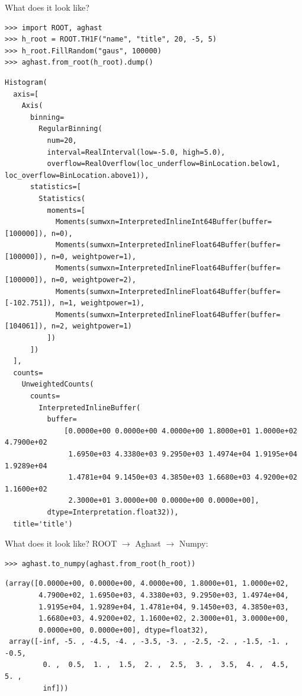 \documentclass[aspectratio=169]{beamer}
\begin{document}
\begin{frame}[fragile]{What does it look like?}
\small
\begin{verbatim}
>>> import ROOT, aghast
>>> h_root = ROOT.TH1F("name", "title", 20, -5, 5)
>>> h_root.FillRandom("gaus", 100000)
>>> aghast.from_root(h_root).dump()
\end{verbatim}


\tiny
\begin{verbatim}
Histogram(
  axis=[
    Axis(
      binning=
        RegularBinning(
          num=20,
          interval=RealInterval(low=-5.0, high=5.0),
          overflow=RealOverflow(loc_underflow=BinLocation.below1, loc_overflow=BinLocation.above1)),
      statistics=[
        Statistics(
          moments=[
            Moments(sumwxn=InterpretedInlineInt64Buffer(buffer=[100000]), n=0),
            Moments(sumwxn=InterpretedInlineFloat64Buffer(buffer=[100000]), n=0, weightpower=1),
            Moments(sumwxn=InterpretedInlineFloat64Buffer(buffer=[100000]), n=0, weightpower=2),
            Moments(sumwxn=InterpretedInlineFloat64Buffer(buffer=[-102.751]), n=1, weightpower=1),
            Moments(sumwxn=InterpretedInlineFloat64Buffer(buffer=[104061]), n=2, weightpower=1)
          ])
      ])
  ],
  counts=
    UnweightedCounts(
      counts=
        InterpretedInlineBuffer(
          buffer=
              [0.0000e+00 0.0000e+00 4.0000e+00 1.8000e+01 1.0000e+02 4.7900e+02
               1.6950e+03 4.3380e+03 9.2950e+03 1.4974e+04 1.9195e+04 1.9289e+04
               1.4781e+04 9.1450e+03 4.3850e+03 1.6680e+03 4.9200e+02 1.1600e+02
               2.3000e+01 3.0000e+00 0.0000e+00 0.0000e+00],
          dtype=Interpretation.float32)),
  title='title')
\end{verbatim}
\end{frame}

\begin{frame}[fragile]{What does it look like?}
\small
{\large ROOT $\to$ Aghast $\to$ Numpy:}
\begin{verbatim}
>>> aghast.to_numpy(aghast.from_root(h_root))
\end{verbatim}

\scriptsize
\begin{verbatim}
(array([0.0000e+00, 0.0000e+00, 4.0000e+00, 1.8000e+01, 1.0000e+02,
        4.7900e+02, 1.6950e+03, 4.3380e+03, 9.2950e+03, 1.4974e+04,
        1.9195e+04, 1.9289e+04, 1.4781e+04, 9.1450e+03, 4.3850e+03,
        1.6680e+03, 4.9200e+02, 1.1600e+02, 2.3000e+01, 3.0000e+00,
        0.0000e+00, 0.0000e+00], dtype=float32),
 array([-inf, -5. , -4.5, -4. , -3.5, -3. , -2.5, -2. , -1.5, -1. , -0.5,
         0. ,  0.5,  1. ,  1.5,  2. ,  2.5,  3. ,  3.5,  4. ,  4.5,  5. ,
         inf]))
\end{verbatim}

\end{frame}
\end{document}
